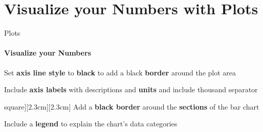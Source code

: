 \documentclass[aspectratio=169]{beamer}
\begin{document}
\section{Visualize your Numbers with \textbf{Plots}}

\begin{frame}
\end{frame}

\begin{frame}{Plots}
    \framesubtitle{Visualize your Numbers}

    \vspace{-1.1cm}
    \begin{minipage}[t]{0.49\textwidth}
        \begin{coloredblockleft}
            \footnotesize
            Set \textbf{axis line style} to \textbf{black} to add a black \textbf{border} around the plot area
        \end{coloredblockleft}
        \vspace{-0.1cm}
        \begin{coloredblockleft}
            \footnotesize
            Include \textbf{axis labels} with descriptions and \textbf{units} and include thousand separator
        \end{coloredblockleft}
        \vspace{-0.1cm}
        \begin{coloredblockleft}[grey][\large\faIcon[regular]{square}][2.3cm][2.3cm]
            \footnotesize
            Add a \textbf{black border} around the \textbf{sections} of the bar chart
        \end{coloredblockleft}
        \vspace{-0.1cm}
        \begin{coloredblockleft}
            \footnotesize
            Include a \textbf{legend} to explain the chart's data categories
        \end{coloredblockleft}
        \vspace{-0.1cm}
        \begin{coloredblock}

\end{coloredblock}
\end{minipage}
\end{frame}
\end{document}
